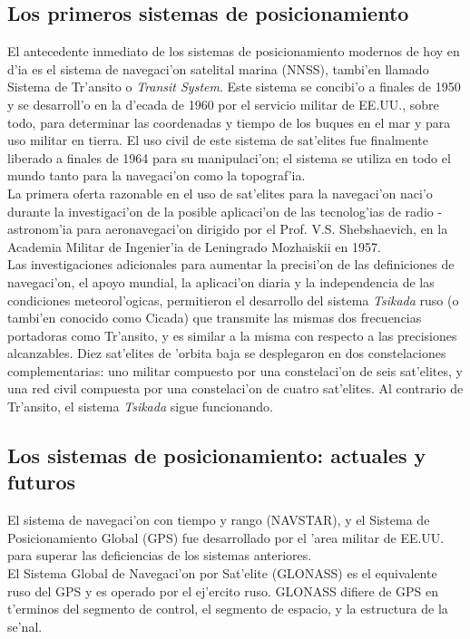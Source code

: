 \subsection{Los primeros sistemas de posicionamiento}
\noindent
El antecedente inmediato de los sistemas de posicionamiento modernos de hoy en d'ia es el sistema de navegaci'on satelital marina (NNSS), tambi'en llamado Sistema de Tr'ansito o \emph{Transit System}. Este sistema se concibi'o a finales de 1950 y se desarroll'o en la d'ecada de 1960 por el servicio militar de EE.UU., sobre todo, para determinar las coordenadas y tiempo de los buques en el mar y para uso militar en tierra. El uso civil de este sistema de sat'elites fue finalmente liberado a finales de 1964 para su manipulaci'on; el sistema se utiliza en todo el mundo tanto para la navegaci'on como la topograf'ia.\\

La primera oferta razonable en el uso de sat'elites para la navegaci'on naci'o durante la investigaci'on de la posible aplicaci'on de las tecnolog'ias de radio - astronom'ia para aeronavegaci'on dirigido por el Prof. V.S. Shebshaevich, en la Academia Militar de Ingenier'ia de Leningrado Mozhaiskii en 1957.\\

Las investigaciones adicionales para aumentar la precisi'on de las definiciones de navegaci'on, el apoyo mundial, la aplicaci'on diaria y la independencia de las condiciones meteorol'ogicas, permitieron el desarrollo del sistema \emph{Tsikada} ruso (o tambi'en conocido como Cicada) que transmite las mismas dos frecuencias portadoras como Tr'ansito, y es similar a la misma con respecto a las precisiones alcanzables. Diez sat'elites de 'orbita baja se desplegaron en dos constelaciones complementarias: uno militar compuesto por una constelaci'on de seis sat'elites, y una red civil compuesta por una constelaci'on de cuatro sat'elites. Al contrario de Tr'ansito, el sistema \emph{Tsikada} sigue funcionando.

\subsection{Los sistemas de posicionamiento: actuales y futuros }
\noindent
El sistema de navegaci'on con tiempo y rango (NAVSTAR), y el Sistema de Posicionamiento Global (GPS) fue desarrollado por el 'area militar de EE.UU. para superar las deficiencias de los sistemas anteriores.\\

El Sistema Global de Navegaci'on por Sat'elite (GLONASS) es el equivalente ruso del GPS y es operado por el ej'ercito ruso. GLONASS difiere de GPS en t'erminos del segmento de control, el segmento de espacio, y la estructura de la se'nal.\\

